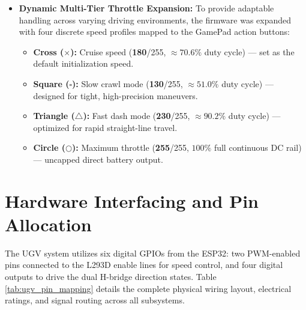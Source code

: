 \documentclass[journal,12pt,onecolumn]{IEEEtran}
\begin{document}
\begin{itemize}
	\item \textbf{Dynamic Multi-Tier Throttle Expansion:} To provide adaptable handling across varying driving environments, the firmware was expanded with four discrete speed profiles mapped to the GamePad action buttons: %
	\begin{itemize}
		\item \textbf{Cross ($\times$):} Cruise speed (\textbf{180}/255, $\approx 70.6\%$ duty cycle) --- set as the default initialization speed. %
		\item \textbf{Square ($\square$):} Slow crawl mode (\textbf{130}/255, $\approx 51.0\%$ duty cycle) --- designed for tight, high-precision maneuvers. %
		\item \textbf{Triangle ($\triangle$):} Fast dash mode (\textbf{230}/255, $\approx 90.2\%$ duty cycle) --- optimized for rapid straight-line travel.
		\item \textbf{Circle ($\bigcirc$):} Maximum throttle (\textbf{255}/255, $100\%$ full continuous DC rail) --- uncapped direct battery output. %
	\end{itemize}
\end{itemize}

\newpage

\section{Hardware Interfacing and Pin Allocation}
The UGV system utilizes six digital GPIOs from the ESP32: two PWM-enabled pins connected to the L293D enable lines for speed control, and four digital outputs to drive the dual H-bridge direction states. %
Table \ref{tab:ugv_pin_mapping} details the complete physical wiring layout, electrical ratings, and signal routing across all subsystems. %
\end{document}

